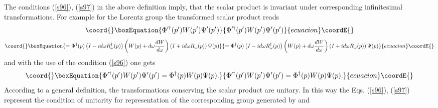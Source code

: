 \documentclass[a4paper,a4paper]{article}
\begin{document}
\noindent The conditions (\ref{s96}), (\ref{s97}) in the above definition
imply, that the scalar product is invariant under corresponding
infinitesimal transformations. For example for the Lorentz group the
transformed scalar product reads 
\begin{equation}\coord{}\boxEquation{
\Phi ^{\prime \dagger }(p^{\prime })W(p^{\prime })\Psi ^{\prime }(p^{\prime
})  \label{s98}
}{
\Phi ^{\prime \dagger }(p^{\prime })W(p^{\prime })\Psi ^{\prime }(p^{\prime
})  }{ecuacion}\coordE{}\end{equation}%
\begin{equation*}\coord{}\boxEquation{
=\Phi ^{\dagger }(p)\left( I-id\omega R_{\omega }^{\dagger }(p)\right)
\left( W(p)+d\omega \frac{dW}{d\omega }\right) \left( I+id\omega R_{\omega
}(p)\right) \Psi (p)
}{
=\Phi ^{\dagger }(p)\left( I-id\omega R_{\omega }^{\dagger }(p)\right)
\left( W(p)+d\omega \frac{dW}{d\omega }\right) \left( I+id\omega R_{\omega
}(p)\right) \Psi (p)
}{ecuacion}\coordE{}\end{equation*}%
and with the use of the condition (\ref{s96}) one gets 
\begin{equation}\coord{}\boxEquation{
\Phi ^{\prime \dagger }(p^{\prime })W(p^{\prime })\Psi ^{\prime }(p^{\prime
})=\Phi ^{\dagger }(p)W(p)\Psi (p).  \label{s99}
}{
\Phi ^{\prime \dagger }(p^{\prime })W(p^{\prime })\Psi ^{\prime }(p^{\prime
})=\Phi ^{\dagger }(p)W(p)\Psi (p).  }{ecuacion}\coordE{}\end{equation}%
According to a general definition, the transformations conserving the scalar
product are unitary. In this way the Eqs. (\ref{s96}), (\ref{s97}) represent
the condition of unitarity for representation of the corresponding group
generated by \coordHE{} and \coordHE{}
\end{document}
